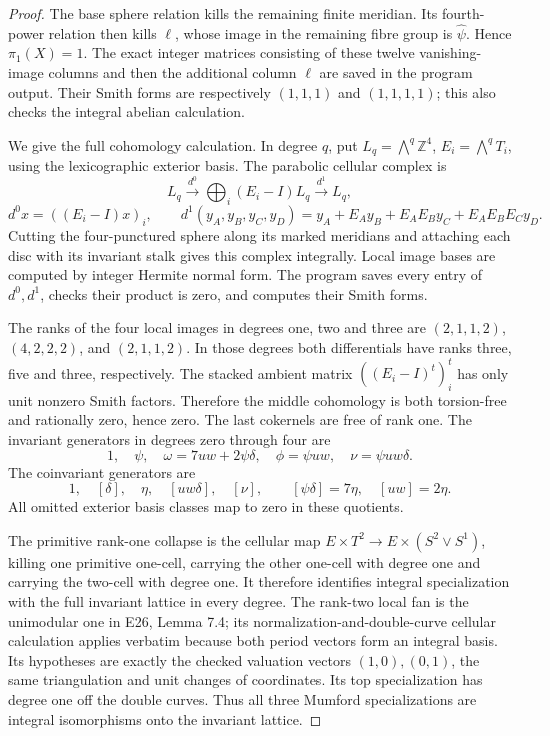 \begin{proof}
The base sphere relation kills the remaining finite meridian. Its fourth-power relation then kills \(\ell\), whose image in the remaining fibre group is \(\widehat\psi\). Hence \(\pi_1(X)=1\). The exact integer matrices consisting of these twelve vanishing-image columns and then the additional column \(\ell\) are saved in the program output. Their Smith forms are respectively \((1,1,1)\) and \((1,1,1,1)\); this also checks the integral abelian calculation.

We give the full cohomology calculation. In degree \(q\), put \(L_q=\bigwedge^q\mathbb Z^4\), \(E_i=\bigwedge^qT_i\), using the lexicographic exterior basis. The parabolic cellular complex is \[
 L_q\xrightarrow{d^0}\bigoplus_i(E_i-I)L_q
       \xrightarrow{d^1}L_q,
\] \[
 d^0x=((E_i-I)x)_i,\qquad
 d^1(y_A,y_B,y_C,y_D)=y_A+E_Ay_B+E_AE_By_C+E_AE_BE_Cy_D.
\] Cutting the four-punctured sphere along its marked meridians and attaching each disc with its invariant stalk gives this complex integrally. Local image bases are computed by integer Hermite normal form. The program saves every entry of \(d^0,d^1\), checks their product is zero, and computes their Smith forms.

The ranks of the four local images in degrees one, two and three are \((2,1,1,2)\), \((4,2,2,2)\), and \((2,1,1,2)\). In those degrees both differentials have ranks three, five and three, respectively. The stacked ambient matrix \(((E_i-I)^t)_i^t\) has only unit nonzero Smith factors. Therefore the middle cohomology is both torsion-free and rationally zero, hence zero. The last cokernels are free of rank one. The invariant generators in degrees zero through four are \[
 1,\quad\psi,\quad\omega=7uw+2\psi\delta,\quad
 \phi=\psi uw,\quad\nu=\psi uw\delta.
\] The coinvariant generators are \[
 1,\quad[\delta],\quad\eta,\quad[uw\delta],\quad[\nu],
 \qquad[\psi\delta]=7\eta,\quad[uw]=2\eta.
\] All omitted exterior basis classes map to zero in these quotients.

The primitive rank-one collapse is the cellular map \(E\times T^2\to E\times(S^2\vee S^1)\), killing one primitive one-cell, carrying the other one-cell with degree one and carrying the two-cell with degree one. It therefore identifies integral specialization with the full invariant lattice in every degree. The rank-two local fan is the unimodular one in E26, Lemma 7.4; its normalization-and-double-curve cellular calculation applies verbatim because both period vectors form an integral basis. Its hypotheses are exactly the checked valuation vectors \((1,0),(0,1)\), the same triangulation and unit changes of coordinates. Its top specialization has degree one off the double curves. Thus all three Mumford specializations are integral isomorphisms onto the invariant lattice.


\end{proof}
